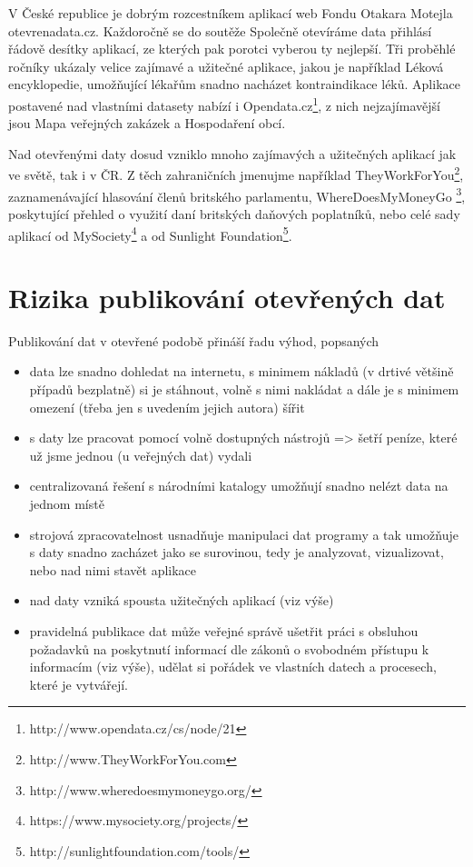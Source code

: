 V České republice je dobrým rozcestníkem aplikací web Fondu Otakara Motejla otevrenadata.cz. Každoročně se do soutěže Společně otevíráme data přihlásí řádově desítky aplikací, ze kterých pak porotci vyberou ty nejlepší. Tři proběhlé ročníky ukázaly velice zajímavé a užitečné aplikace, jakou je například Léková encyklopedie, umožňující lékařům snadno nacházet kontraindikace léků. Aplikace postavené nad vlastními datasety nabízí i Opendata.cz\footnote{http://www.opendata.cz/cs/node/21}, z nich nejzajímavější jsou Mapa veřejných zakázek a Hospodaření obcí.

Nad otevřenými daty dosud vzniklo mnoho zajímavých a užitečných aplikací jak ve světě, tak i v ČR. Z těch zahraničních jmenujme například TheyWorkForYou\footnote{http://www.TheyWorkForYou.com}, zaznamenávající hlasování členů britského parlamentu, WhereDoesMyMoneyGo \footnote{http://www.wheredoesmymoneygo.org/}, poskytující přehled o využití daní britských daňových poplatníků, nebo celé sady aplikací od MySociety\footnote{https://www.mysociety.org/projects/} a od Sunlight Foundation\footnote{http://sunlightfoundation.com/tools/}.

\section{Rizika publikování otevřených dat}

Publikování dat v otevřené podobě přináší řadu výhod, popsaných 
\begin{itemize}
	\item data lze snadno dohledat na internetu, s minimem nákladů (v drtivé většině případů bezplatně) si je stáhnout, volně s nimi nakládat a dále je s minimem omezení (třeba jen s uvedením jejich autora) šířit
	\item s daty lze pracovat pomocí volně dostupných nástrojů => šetří peníze, které už jsme jednou (u veřejných dat) vydali
	\item centralizovaná řešení s národními katalogy umožňují snadno nelézt data na jednom místě
	\item strojová zpracovatelnost usnadňuje manipulaci dat programy a tak umožňuje s daty snadno zacházet jako se surovinou, tedy je analyzovat, vizualizovat, nebo nad nimi stavět aplikace
	\item nad daty vzniká spousta užitečných aplikací (viz výše)
	\item pravidelná publikace dat může veřejné správě ušetřit práci s obsluhou požadavků na poskytnutí informací dle zákonů o svobodném přístupu k informacím (viz výše), udělat si pořádek ve vlastních datech a procesech, které je vytvářejí.
\end{itemize}

